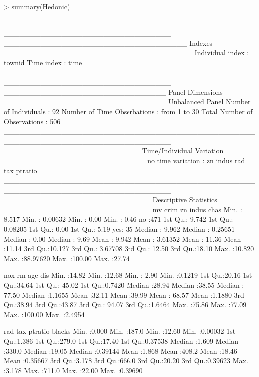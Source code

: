 \documentclass{article}
\begin{document}
\begin{Schunk}
\begin{Sinput}
> summary(Hedonic)
\end{Sinput}
\begin{Soutput}
________________________________________________________________________________ 
___________________________________ Indexes ____________________________________
Individual index : townid
Time index       : time
________________________________________________________________________________ 
_______________________________ Panel Dimensions _______________________________
Unbalanced Panel
Number of Individuals        :  92
Number of Time Obserbations  :  from 1 to 30
Total Number of Observations :  506
________________________________________________________________________________ 
__________________________ Time/Individual Variation ___________________________
no time variation   :  zn indus rad tax ptratio 
________________________________________________________________________________ 
____________________________ Descriptive Statistics ____________________________
       mv              crim                zn             indus        chas    
 Min.   : 8.517   Min.   : 0.00632   Min.   :  0.00   Min.   : 0.46   no :471  
 1st Qu.: 9.742   1st Qu.: 0.08205   1st Qu.:  0.00   1st Qu.: 5.19   yes: 35  
 Median : 9.962   Median : 0.25651   Median :  0.00   Median : 9.69            
 Mean   : 9.942   Mean   : 3.61352   Mean   : 11.36   Mean   :11.14            
 3rd Qu.:10.127   3rd Qu.: 3.67708   3rd Qu.: 12.50   3rd Qu.:18.10            
 Max.   :10.820   Max.   :88.97620   Max.   :100.00   Max.   :27.74            
                                                                               
      nox              rm             age              dis        
 Min.   :14.82   Min.   :12.68   Min.   :  2.90   Min.   :0.1219  
 1st Qu.:20.16   1st Qu.:34.64   1st Qu.: 45.02   1st Qu.:0.7420  
 Median :28.94   Median :38.55   Median : 77.50   Median :1.1655  
 Mean   :32.11   Mean   :39.99   Mean   : 68.57   Mean   :1.1880  
 3rd Qu.:38.94   3rd Qu.:43.87   3rd Qu.: 94.07   3rd Qu.:1.6464  
 Max.   :75.86   Max.   :77.09   Max.   :100.00   Max.   :2.4954  
                                                                  
      rad             tax           ptratio          blacks       
 Min.   :0.000   Min.   :187.0   Min.   :12.60   Min.   :0.00032  
 1st Qu.:1.386   1st Qu.:279.0   1st Qu.:17.40   1st Qu.:0.37538  
 Median :1.609   Median :330.0   Median :19.05   Median :0.39144  
 Mean   :1.868   Mean   :408.2   Mean   :18.46   Mean   :0.35667  
 3rd Qu.:3.178   3rd Qu.:666.0   3rd Qu.:20.20   3rd Qu.:0.39623  
 Max.   :3.178   Max.   :711.0   Max.   :22.00   Max.   :0.39690  
                                                                  

\end{Soutput}
\end{Schunk}
\end{document}
